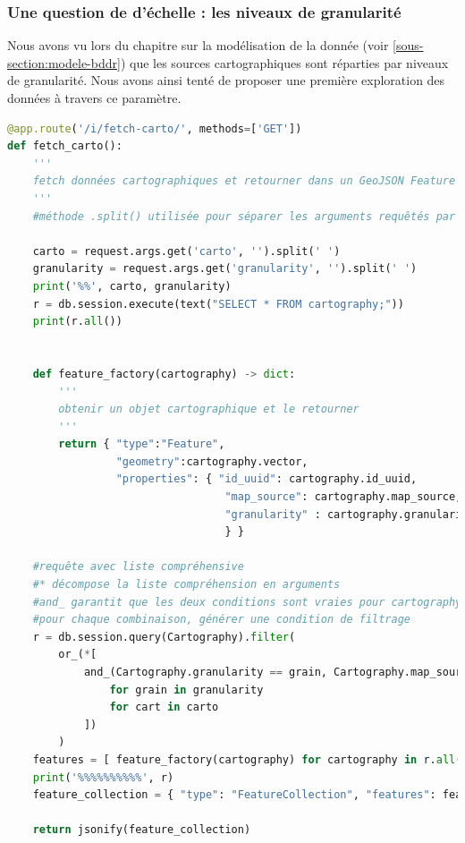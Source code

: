 \subsubsection{Une question de d'échelle : les niveaux de granularité}
Nous avons vu lors du chapitre sur la modélisation de la donnée (voir \ref{sous-section:modele-bddr}) que les sources cartographiques sont réparties par niveaux de granularité. Nous avons ainsi tenté de proposer une première exploration des données à travers ce paramètre.
\begin{lstlisting}[language=PYTHON, caption=Récupérer les données cartographiques par granularité]
@app.route('/i/fetch-carto/', methods=['GET'])
def fetch_carto():
    '''
    fetch données cartographiques et retourner dans un GeoJSON Feature Collection 
    '''
    #méthode .split() utilisée pour séparer les arguments requêtés par le front
    
    carto = request.args.get('carto', '').split(' ')
    granularity = request.args.get('granularity', '').split(' ')
    print('%%', carto, granularity)
    r = db.session.execute(text("SELECT * FROM cartography;"))
    print(r.all())

 
    def feature_factory(cartography) -> dict:
        '''
        obtenir un objet cartographique et le retourner 
        '''
        return { "type":"Feature",
                 "geometry":cartography.vector,
                 "properties": { "id_uuid": cartography.id_uuid,
                                  "map_source": cartography.map_source,
                                  "granularity" : cartography.granularity                                  
                                  } } 
                                  
    #requête avec liste compréhensive
    #* décompose la liste compréhension en arguments
    #and_ garantit que les deux conditions sont vraies pour cartography.granularity&cartography.map_source
    #pour chaque combinaison, générer une condition de filtrage
    r = db.session.query(Cartography).filter(
        or_(*[
            and_(Cartography.granularity == grain, Cartography.map_source == cart)
                for grain in granularity  
                for cart in carto  
            ])
        )
    features = [ feature_factory(cartography) for cartography in r.all() ]
    print('%%%%%%%%%%', r)
    feature_collection = { "type": "FeatureCollection", "features": features }

    return jsonify(feature_collection)
\end{lstlisting}

